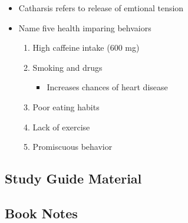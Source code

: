 \documentclass{article}
\begin{document}
\begin{itemize}
\begin{itemize}
        \item Catharsis refers to release of emtional tension
        \item Name five health imparing behvaiors
        \begin{enumerate}
            \item High caffeine intake (600 mg)
            \item Smoking and drugs
            \begin{itemize}
                \item Increases chances of heart disease
            \end{itemize}
            \item Poor eating habits
            \item Lack of exercise
            \item Promiscuous behavior
        \end{enumerate}
    \end{itemize}
\end{itemize}

\subsection{Study Guide Material}
\subsection{Book Notes}
\end{document}
